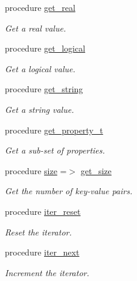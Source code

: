 \begin{DoxyCompactItemize}
procedure \mbox{\hyperlink{structpmc__property_1_1property__t_ab3da34666ee533c3d9f15e1af01af91c}{get\+\_\+real}}
\begin{DoxyCompactList}\small\item\em Get a real value. \end{DoxyCompactList}\item 
procedure \mbox{\hyperlink{structpmc__property_1_1property__t_a9b4e1e6c03c1ca25d6a064a395e7943e}{get\+\_\+logical}}
\begin{DoxyCompactList}\small\item\em Get a logical value. \end{DoxyCompactList}\item 
procedure \mbox{\hyperlink{structpmc__property_1_1property__t_a11f0d57b16e168afcad737351ec629d8}{get\+\_\+string}}
\begin{DoxyCompactList}\small\item\em Get a string value. \end{DoxyCompactList}\item 
procedure \mbox{\hyperlink{structpmc__property_1_1property__t_a693851f2a291a4aff27884964b4ff527}{get\+\_\+property\+\_\+t}}
\begin{DoxyCompactList}\small\item\em Get a sub-\/set of properties. \end{DoxyCompactList}\item 
procedure \mbox{\hyperlink{structpmc__property_1_1property__t_af1dd17e5913da8175515a6a125767418}{size}} =$>$ \mbox{\hyperlink{namespacepmc__property_a51142a5a96c616638b781bc56dd808a9}{get\+\_\+size}}
\begin{DoxyCompactList}\small\item\em Get the number of key-\/value pairs. \end{DoxyCompactList}\item 
procedure \mbox{\hyperlink{structpmc__property_1_1property__t_a8a526b8fdaf30090222bd427b65e2767}{iter\+\_\+reset}}
\begin{DoxyCompactList}\small\item\em Reset the iterator. \end{DoxyCompactList}\item 
procedure \mbox{\hyperlink{structpmc__property_1_1property__t_a1a8059bc933417c2a21b15b2d72d0764}{iter\+\_\+next}}
\begin{DoxyCompactList}\small\item\em Increment the iterator. \end{DoxyCompactList}\item 

\end{DoxyCompactItemize}
